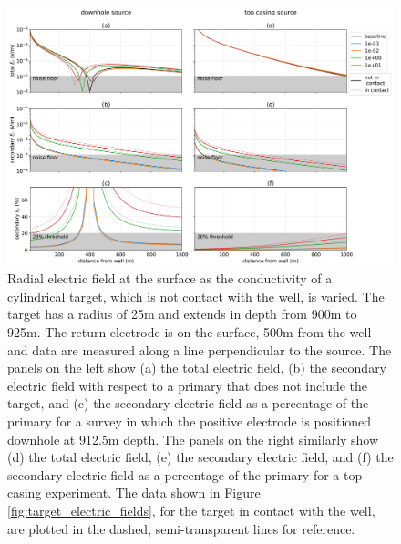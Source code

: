 \begin{figure}
    \begin{center}
    \includegraphics[width=\textwidth]{figures/dc_casing/offset_electric_fields.png}
    \end{center}
\caption{
    Radial electric field at the surface as the conductivity of a cylindrical target, which is not contact with the well,
    is varied. The target has a radius of 25m and extends in depth from 900m to 925m. The return electrode
    is on the surface, 500m from the well and data are measured along a line perpendicular to the source.
    The panels on the left show
    (a) the total electric field, (b) the secondary electric field with respect to a primary that does not include the target,
    and (c) the secondary electric field as a percentage of the primary for a survey in which the positive electrode is
    positioned downhole at 912.5m depth. The panels on the right similarly show (d) the total electric field, (e) the
    secondary electric field, and (f) the secondary electric field as a percentage of the primary for a top-casing experiment.
    The data shown in Figure \ref{fig:target_electric_fields}, for the target in contact with the well,
    are plotted in the dashed, semi-transparent lines for reference.
}
\label{fig:offset_electric_fields}
\end{figure}
